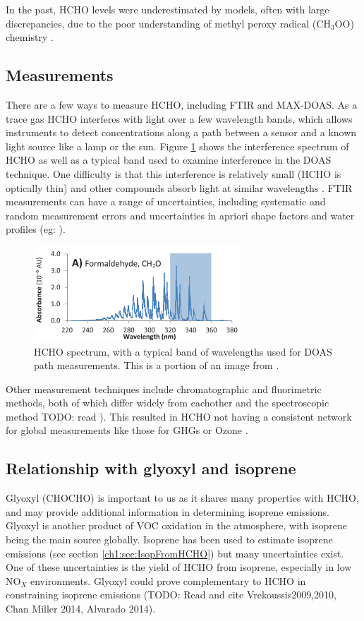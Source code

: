     In the past, HCHO levels were underestimated by models, often with large discrepancies, due to the poor understanding of methyl peroxy radical (CH$_3$OO) chemistry \citep{Wagner2002}.
    
  \subsection{Measurements}
    There are a few ways to measure HCHO, including FTIR and MAX-DOAS. 
    As a trace gas HCHO interferes with light over a few wavelength bands, which allows instruments to detect concentrations along a path between a sensor and a known light source like a lamp or the sun.
    Figure \ref{ch1:fig:HCHOSpectrum} shows the interference spectrum of HCHO as well as a typical band used to examine interference in the DOAS technique.
    One difficulty is that this interference is relatively small (HCHO is optically thin) and other compounds absorb light at similar wavelengths \citep{Davenport2015}.
    FTIR measurements can have a range of uncertainties, including systematic and random measurement errors and uncertainties in apriori shape factors and water profiles (eg: \citet{Franco2015}).
    
    \begin{figure}
      \includegraphics{Figures/HCHO/HCHOAbsorbanceDavenport.png}
      \caption{ HCHO spectrum, with a typical band of wavelengths used for DOAS path measurements.
	This is a portion of an image from \citet{Davenport2015}.}
      \label{ch1:fig:HCHOSpectrum}
    \end{figure}
    
    Other measurement techniques include chromatographic and fluorimetric methods, both of which differ widely from eachother and the spectroscopic method TODO: read \citep{Hak2005}).
    This resulted in HCHO not having a consistent network for global measurements like those for GHGs or Ozone \citep{FortemsCheiney2012}.
    
  \subsection{Relationship with glyoxyl and isoprene}
    Glyoxyl (CHOCHO) is important to us as it shares many properties with HCHO, and may provide additional information in determining isoprene emissions.
    Glyoxyl is another product of VOC oxidation in the atmosphere, with isoprene being the main source globally.
    Isoprene has been used to estimate isoprene emissions (see section \ref{ch1:sec:IsopFromHCHO}) but many uncertainties exist.
    One of these uncertainties is the yield of HCHO from isoprene, especially in low NO$_X$ environments.
    Glyoxyl could prove complementary to HCHO in constraining isoprene emissions (TODO: Read and cite Vrekoussis2009,2010, Chan Miller 2014, Alvarado 2014).
    
